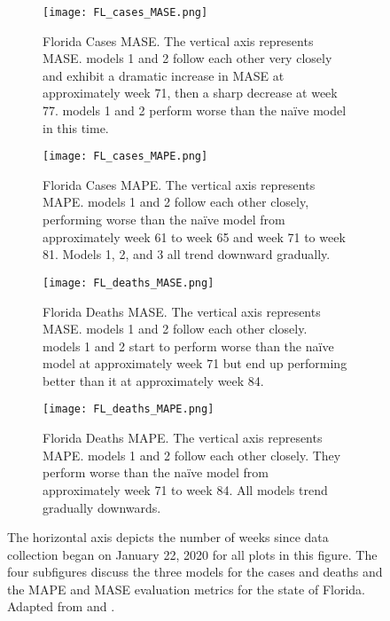 \begin{figure}
\centering
\begin{subfigure}[t]{0.45\textwidth}
\texttt{[image: FL\_cases\_MASE.png]}
\caption{Florida Cases {MASE}. The vertical axis represents MASE. models 1 and 2 follow each other very closely and exhibit a dramatic increase in {MASE} at approximately week 71, then a sharp decrease at week 77. models 1 and 2 perform worse than the na\"ive model in this time.}
\end{subfigure}\hfill
\begin{subfigure}[t]{0.45\textwidth}
\texttt{[image: FL\_cases\_MAPE.png]}
\caption{Florida Cases {MAPE}. The vertical axis represents MAPE. models 1 and 2 follow each other closely, performing worse than the na\"ive model from approximately week 61 to week 65 and week 71 to week 81. Models 1, 2, and 3 all trend downward gradually.}
\end{subfigure}
\begin{subfigure}[t]{0.45\textwidth}
\texttt{[image: FL\_deaths\_MASE.png]}
\caption{Florida Deaths {MASE}. The vertical axis represents MASE. models 1 and 2 follow each other closely. models 1 and 2 start to perform worse than the na\"ive model at approximately week 71 but end up performing better than it at approximately week 84.}
\end{subfigure}\hfill
\begin{subfigure}[t]{0.45\textwidth}
\texttt{[image: FL\_deaths\_MAPE.png]}
\caption{Florida Deaths {MAPE}. The vertical axis represents MAPE. models 1 and 2 follow each other closely. They perform worse than the na\"ive model from approximately week 71 to week 84. All models trend gradually downwards.}
\end{subfigure}
\caption{The horizontal axis depicts the number of weeks since data collection began on January 22, 2020 for all plots in this figure. The four subfigures discuss the three models for the cases and deaths and the MAPE and MASE evaluation metrics for the state of Florida. Adapted from \cite{USCB:2019} and \cite{USAFacts:2021a}.
}
\label{fig:FL}
\end{figure}




